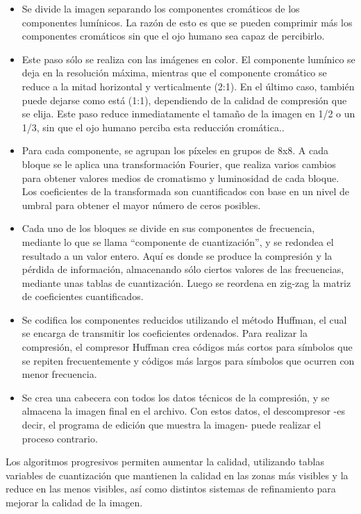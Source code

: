 \documentclass[12pt,letterpaper,titlepage]{article}
\begin{document}
\begin{itemize}
\begin{itemize}
\begin{itemize}\itemsep=0pt
\item  Se divide la imagen separando los componentes cromáticos de los componentes lumínicos. La razón de esto es que se pueden comprimir más los componentes cromáticos sin que el ojo humano sea capaz de percibirlo.\\
\item Este paso sólo se realiza con las imágenes en color. El componente lumínico se deja en la resolución máxima, mientras que el componente cromático se reduce a la mitad horizontal y verticalmente (2:1). En el último caso, también puede dejarse como está (1:1), dependiendo de la calidad de compresión que se elija. Este paso reduce inmediatamente el tamaño de la imagen en 1/2 o un 1/3, sin que el ojo humano perciba esta reducción cromática..\\
\item Para cada componente, se agrupan los píxeles en grupos de 8x8. A cada bloque se le aplica una transformación Fourier, que realiza varios cambios para obtener valores medios de cromatismo y luminosidad de cada bloque. Los coeficientes de la transformada son cuantificados con base en un nivel de umbral para obtener el mayor número de ceros posibles.\\
\item Cada uno de los bloques se divide en sus componentes de frecuencia, mediante lo que se llama “componente de cuantización”, y se redondea el resultado a un valor entero. Aquí es donde se produce la compresión y la pérdida de información, almacenando sólo ciertos valores de las frecuencias, mediante unas tablas de cuantización. Luego se reordena en zig-zag la matriz de coeficientes cuantificados.\\
\item Se codifica los componentes reducidos utilizando el método Huffman, el cual se encarga de transmitir los coeficientes ordenados. Para realizar la compresión, el compresor Huffman crea códigos más cortos para símbolos que se repiten frecuentemente y códigos más largos para símbolos que ocurren con menor frecuencia.\\
\item Se crea una cabecera con todos los datos técnicos de la compresión, y se almacena la imagen final en el archivo. Con estos datos, el descompresor -es decir, el programa de edición que muestra la imagen- puede realizar el proceso contrario.\\
\end{itemize}
Los algoritmos progresivos permiten aumentar la calidad, utilizando tablas variables de cuantización que mantienen la calidad en las zonas más visibles y la reduce en las menos visibles, así como distintos sistemas de refinamiento para mejorar la calidad de la imagen.\\


\end{itemize}
\end{itemize}
\end{document}
